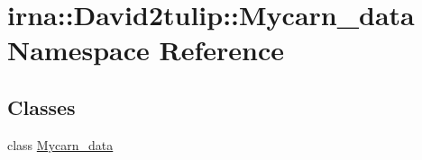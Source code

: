 \hypertarget{namespaceirna_1_1David2tulip_1_1Mycarn__data}{
\section{irna\-:\-:\-David2tulip\-:\-:\-Mycarn\-\_\-data \-Namespace \-Reference}
\label{namespaceirna_1_1David2tulip_1_1Mycarn__data}
}
\subsection*{\-Classes}
\begin{DoxyCompactItemize}
\item 
class \hyperlink{classirna_1_1David2tulip_1_1Mycarn__data_1_1Mycarn__data}{\-Mycarn\-\_\-data}
\end{DoxyCompactItemize}
